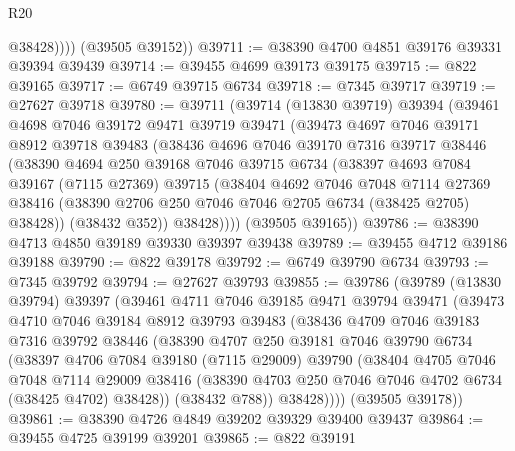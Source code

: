 \begin{lexlean}{R20}
\begin{coremodule}
{              @38428))))
      (@39505 @39152))
@39711 := @38390 @4700 @4851 @39176 @39331 @39394 @39439
@39714 := @39455 @4699 @39173 @39175
@39715 := @822 @39165
@39717 := @6749 @39715 @6734
@39718 := @7345 @39717
@39719 := @27627 @39718
@39780 := @39711
    (@39714
      (@13830 @39719)
      @39394
      (@39461
        @4698
        @7046
        @39172
        @9471
        @39719
        @39471
        (@39473
          @4697
          @7046
          @39171
          @8912
          @39718
          @39483
          (@38436
            @4696
            @7046
            @39170
            @7316
            @39717
            @38446
            (@38390
              @4694
              @250
              @39168
              @7046
              @39715
              @6734
              (@38397
                @4693
                @7084
                @39167
                (@7115 @27369)
                @39715
                (@38404
                  @4692
                  @7046
                  @7048
                  @7114
                  @27369
                  @38416
                  (@38390 @2706 @250 @7046 @7046 @2705 @6734 (@38425 @2705) @38428))
                (@38432 @352))
              @38428))))
      (@39505 @39165))
@39786 := @38390 @4713 @4850 @39189 @39330 @39397 @39438
@39789 := @39455 @4712 @39186 @39188
@39790 := @822 @39178
@39792 := @6749 @39790 @6734
@39793 := @7345 @39792
@39794 := @27627 @39793
@39855 := @39786
    (@39789
      (@13830 @39794)
      @39397
      (@39461
        @4711
        @7046
        @39185
        @9471
        @39794
        @39471
        (@39473
          @4710
          @7046
          @39184
          @8912
          @39793
          @39483
          (@38436
            @4709
            @7046
            @39183
            @7316
            @39792
            @38446
            (@38390
              @4707
              @250
              @39181
              @7046
              @39790
              @6734
              (@38397
                @4706
                @7084
                @39180
                (@7115 @29009)
                @39790
                (@38404
                  @4705
                  @7046
                  @7048
                  @7114
                  @29009
                  @38416
                  (@38390 @4703 @250 @7046 @7046 @4702 @6734 (@38425 @4702) @38428))
                (@38432 @788))
              @38428))))
      (@39505 @39178))
@39861 := @38390 @4726 @4849 @39202 @39329 @39400 @39437
@39864 := @39455 @4725 @39199 @39201
@39865 := @822 @39191
}
\end{coremodule}
\end{lexlean}
